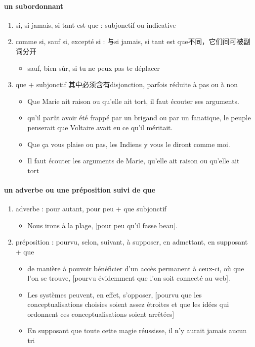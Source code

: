 \documentclass[UTF8]{report}
\begin{document}
\paragraph{un subordonnant}
\begin{enumerate}
    \item si, si jamais, si tant est que : subjonctif ou indicative 
    \item comme si, sauf si, excepté si : 与si jamais, si tant est que不同，它们间可被副词分开
    \begin{itemize}
        \item sauf, bien sûr, si tu ne peux pas te déplacer
    \end{itemize}
    \item que + subjonctif 其中必须含有disjonction, parfois réduite à pas ou à non
    \begin{itemize}
        \item Que Marie ait raison ou qu’elle ait tort, il faut écouter ses arguments.
        \item qu’il parût avoir été frappé par un brigand ou par un fanatique, le peuple penserait que Voltaire avait eu ce qu’il méritait.
        \item Que ça vous plaise ou pas, les Indiens y vous le diront comme moi.
        \item Il faut écouter les arguments de Marie, qu’elle ait raison ou qu’elle ait tort
    \end{itemize}
\end{enumerate}

\paragraph{un adverbe ou une préposition suivi de que}
\begin{enumerate}
    \item adverbe : pour autant, pour peu + que subjonctif
    \begin{itemize}
        \item Nous irons à la plage, [pour peu qu’il fasse beau].
    \end{itemize}
    \item préposition : pourvu, selon, suivant, à supposer, en admettant, en supposant + que
    \begin{itemize}
        \item de manière à pouvoir bénéficier d’un accès permanent à ceux-ci, où que l’on se trouve, [pourvu évidemment que l’on soit connecté au web].
        \item Les systèmes peuvent, en effet, s’opposer, [pourvu que les conceptualisations choisies soient assez étroites et que les idées qui ordonnent ces conceptualisations soient arrêtées]
        \item En supposant que toute cette magie réussisse, il n’y aurait jamais aucun tri 
    \end{itemize}
\end{enumerate}
\end{document}
